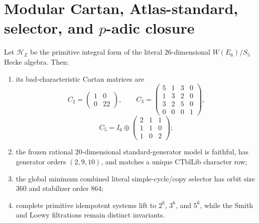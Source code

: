 \section{Modular Cartan, Atlas-standard, selector, and $p$-adic closure}
\label{sec:bt1340-bt1344-cartan-atlas-selector-padic}

\begin{theorem}
Let $\mathcal H_{\mathbb Z}$ be the primitive integral form of the literal
$26$-dimensional $W(E_6)/S_5$ Hecke algebra.  Then:
\begin{enumerate}
\item its bad-characteristic Cartan matrices are
\[
C_2=\begin{pmatrix}1&0\\0&22\end{pmatrix},\qquad
C_3=\begin{pmatrix}5&1&3&0\\1&3&2&0\\3&2&5&0\\0&0&0&1\end{pmatrix},
\]
\[
C_5=I_6\oplus\begin{pmatrix}2&1&1\\1&1&0\\1&0&2\end{pmatrix};
\]
\item the frozen rational $20$-dimensional standard-generator model is faithful,
has generator orders $(2,9,10)$, and matches a unique CTblLib character row;
\item the global minimum combined literal simple-cycle/copy selector has orbit
size $360$ and stabilizer order $864$;
\item complete primitive idempotent systems lift to $2^6$, $3^6$, and $5^6$,
while the Smith and Loewy filtrations remain distinct invariants.
\end{enumerate}
\end{theorem}

